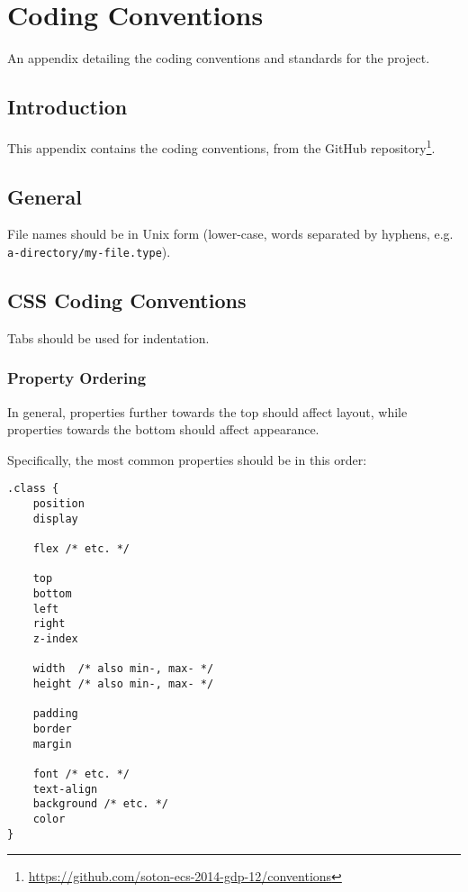 \chapter{Coding Conventions} \label{App:Coding Conventions}

\begin{preamble}
	An appendix detailing the coding conventions and standards for the project.
\end{preamble}

\section{Introduction}

This appendix contains the coding conventions, from the GitHub repository\footnote{\url{https://github.com/soton-ecs-2014-gdp-12/conventions}}.

\section{General}

File names should be in Unix form (lower-case, words separated by
hyphens, e.g. \texttt{a-directory/my-file.type}).

\section{CSS Coding Conventions}

Tabs should be used for indentation.

\subsection{Property Ordering}

In general, properties further towards the top should affect layout,
while properties towards the bottom should affect appearance.

Specifically, the most common properties should be in this order:

\begin{lstlisting}
.class {
	position
	display

	flex /* etc. */

	top
	bottom
	left
	right
	z-index

	width  /* also min-, max- */
	height /* also min-, max- */

	padding
	border
	margin

	font /* etc. */
	text-align
	background /* etc. */
	color
}
\end{lstlisting}

